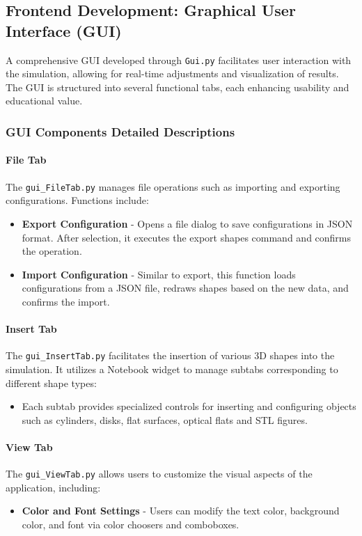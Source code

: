 \documentclass[../main.tex]{subfiles}
\begin{document}
\subsection{Frontend Development: Graphical User Interface (GUI)}
A comprehensive GUI developed through \texttt{Gui.py} facilitates user interaction with the simulation, allowing for real-time adjustments and visualization of results. The GUI is structured into several functional tabs, each enhancing usability and educational value.

\subsubsection{GUI Components Detailed Descriptions}
\paragraph{File Tab}
The \texttt{gui\_FileTab.py} manages file operations such as importing and exporting configurations. Functions include:
\begin{itemize}
    \item \textbf{Export Configuration} - Opens a file dialog to save configurations in JSON format. After selection, it executes the export shapes command and confirms the operation.
    \item \textbf{Import Configuration} - Similar to export, this function loads configurations from a JSON file, redraws shapes based on the new data, and confirms the import.
\end{itemize}

\paragraph{Insert Tab}
The \texttt{gui\_InsertTab.py} facilitates the insertion of various 3D shapes into the simulation. It utilizes a Notebook widget to manage subtabs corresponding to different shape types:
\begin{itemize}
    \item Each subtab provides specialized controls for inserting and configuring objects such as cylinders, disks, flat surfaces, optical flats and STL figures.
\end{itemize}

\paragraph{View Tab}
The \texttt{gui\_ViewTab.py} allows users to customize the visual aspects of the application, including:
\begin{itemize}
    \item \textbf{Color and Font Settings} - Users can modify the text color, background color, and font via color choosers and comboboxes.
\end{itemize}
\end{document}
